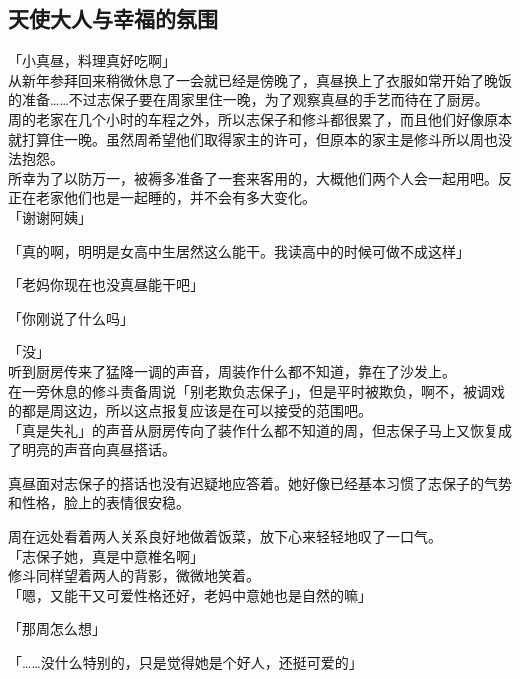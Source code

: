 \subsection{天使大人与幸福的氛围}

「小真昼，料理真好吃啊」\\

从新年参拜回来稍微休息了一会就已经是傍晚了，真昼换上了衣服如常开始了晚饭的准备……不过志保子要在周家里住一晚，为了观察真昼的手艺而待在了厨房。\\

周的老家在几个小时的车程之外，所以志保子和修斗都很累了，而且他们好像原本就打算住一晚。虽然周希望他们取得家主的许可，但原本的家主是修斗所以周也没法抱怨。\\

所幸为了以防万一，被褥多准备了一套来客用的，大概他们两个人会一起用吧。反正在老家他们也是一起睡的，并不会有多大变化。\\

「谢谢阿姨」

「真的啊，明明是女高中生居然这么能干。我读高中的时候可做不成这样」

「老妈你现在也没真昼能干吧」

「你刚说了什么吗」

「没」\\

听到厨房传来了猛降一调的声音，周装作什么都不知道，靠在了沙发上。\\

在一旁休息的修斗责备周说「别老欺负志保子」，但是平时被欺负，啊不，被调戏的都是周这边，所以这点报复应该是在可以接受的范围吧。\\

「真是失礼」的声音从厨房传向了装作什么都不知道的周，但志保子马上又恢复成了明亮的声音向真昼搭话。

真昼面对志保子的搭话也没有迟疑地应答着。她好像已经基本习惯了志保子的气势和性格，脸上的表情很安稳。

周在远处看着两人关系良好地做着饭菜，放下心来轻轻地叹了一口气。\\

「志保子她，真是中意椎名啊」\\

修斗同样望着两人的背影，微微地笑着。\\

「嗯，又能干又可爱性格还好，老妈中意她也是自然的嘛」

「那周怎么想」

「……没什么特别的，只是觉得她是个好人，还挺可爱的」

